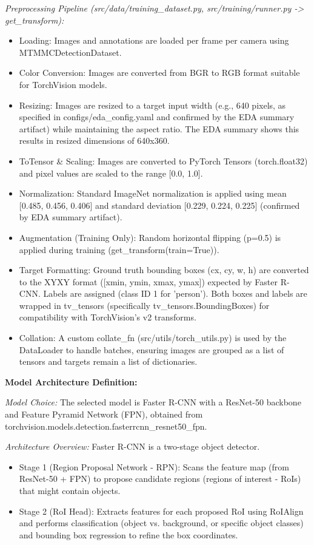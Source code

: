\textit{Preprocessing Pipeline (src/data/training\_dataset.py, src/training/runner.py -> get\_transform):}
\begin{itemize}
    \item Loading: Images and annotations are loaded per frame per camera using MTMMCDetectionDataset.
    \item Color Conversion: Images are converted from BGR to RGB format suitable for TorchVision models.
    \item Resizing: Images are resized to a target input width (e.g., 640 pixels, as specified in configs/eda\_config.yaml and confirmed by the EDA summary artifact) while maintaining the aspect ratio. The EDA summary shows this results in resized dimensions of 640x360.
    \item ToTensor \& Scaling: Images are converted to PyTorch Tensors (torch.float32) and pixel values are scaled to the range [0.0, 1.0].
    \item Normalization: Standard ImageNet normalization is applied using mean [0.485, 0.456, 0.406] and standard deviation [0.229, 0.224, 0.225] (confirmed by EDA summary artifact).
    \item Augmentation (Training Only): Random horizontal flipping (p=0.5) is applied during training (get\_transform(train=True)).
    \item Target Formatting: Ground truth bounding boxes (cx, cy, w, h) are converted to the XYXY format ([xmin, ymin, xmax, ymax]) expected by Faster R-CNN. Labels are assigned (class ID 1 for 'person'). Both boxes and labels are wrapped in tv\_tensors (specifically tv\_tensors.BoundingBoxes) for compatibility with TorchVision's v2 transforms.
    \item Collation: A custom collate\_fn (src/utils/torch\_utils.py) is used by the DataLoader to handle batches, ensuring images are grouped as a list of tensors and targets remain a list of dictionaries.
\end{itemize}

\textbf{Model Architecture Definition:}

\textit{Model Choice:} The selected model is Faster R-CNN with a ResNet-50 backbone and Feature Pyramid Network (FPN), obtained from torchvision.models.detection.fasterrcnn\_resnet50\_fpn.

\textit{Architecture Overview:} Faster R-CNN is a two-stage object detector.
\begin{itemize}
    \item Stage 1 (Region Proposal Network - RPN): Scans the feature map (from ResNet-50 + FPN) to propose candidate regions (regions of interest - RoIs) that might contain objects.
    \item Stage 2 (RoI Head): Extracts features for each proposed RoI using RoIAlign and performs classification (object vs. background, or specific object classes) and bounding box regression to refine the box coordinates.
\end{itemize}

